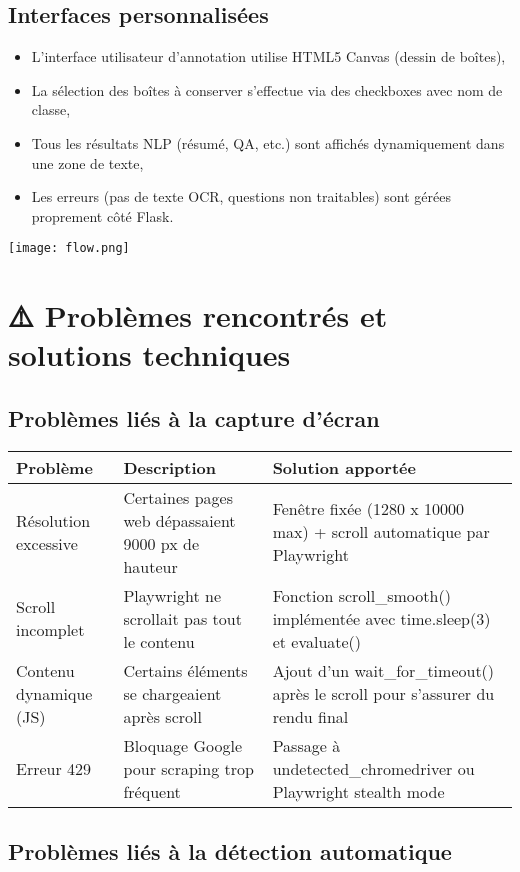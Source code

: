 \documentclass[12pt,a4paper]{report}
\begin{document}
\section{Interfaces personnalisées}

\begin{itemize}
\item L'interface utilisateur d'annotation utilise HTML5 Canvas (dessin de boîtes),
\item La sélection des boîtes à conserver s'effectue via des checkboxes avec nom de classe,
\item Tous les résultats NLP (résumé, QA, etc.) sont affichés dynamiquement dans une zone de texte,
\item Les erreurs (pas de texte OCR, questions non traitables) sont gérées proprement côté Flask.
\end{itemize}
\texttt{[image: flow.png]}

\chapter{⚠️ Problèmes rencontrés et solutions techniques}

\section{Problèmes liés à la capture d'écran}

\begin{longtable}{|p{3cm}|p{5cm}|p{6cm}|}
\hline
\textbf{Problème} & \textbf{Description} & \textbf{Solution apportée} \\
\hline
Résolution excessive & Certaines pages web dépassaient 9000 px de hauteur & Fenêtre fixée (1280 x 10000 max) + scroll automatique par Playwright \\
\hline
Scroll incomplet & Playwright ne scrollait pas tout le contenu & Fonction scroll\_smooth() implémentée avec time.sleep(3) et evaluate() \\
\hline
Contenu dynamique (JS) & Certains éléments se chargeaient après scroll & Ajout d'un wait\_for\_timeout() après le scroll pour s'assurer du rendu final \\
\hline
Erreur 429 & Bloquage Google pour scraping trop fréquent & Passage à undetected\_chromedriver ou Playwright stealth mode \\
\hline
\end{longtable}

\section{Problèmes liés à la détection automatique}
\end{document}
